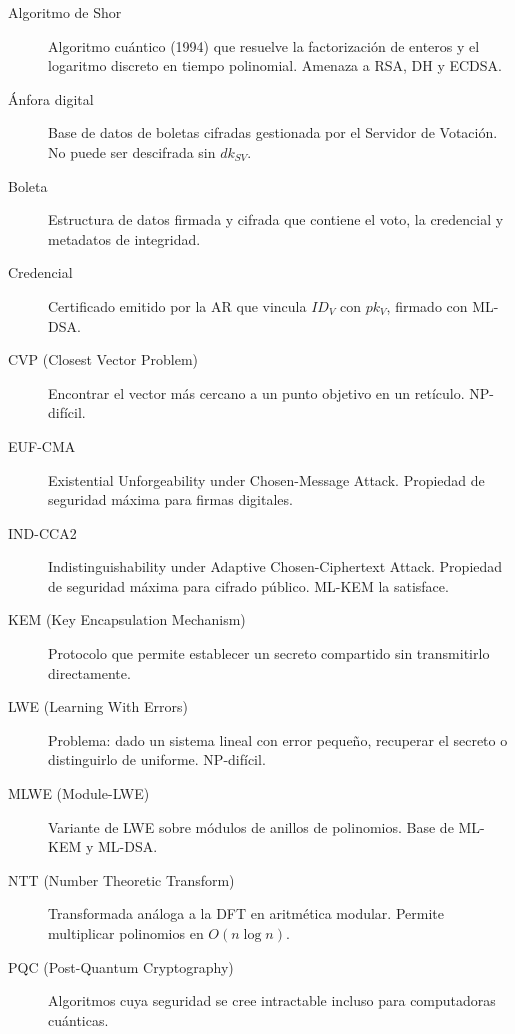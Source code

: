 \documentclass[12pt,a4paper,twoside,openright]{book}
\theoremstyle{plain}
\theoremstyle{definition}
\theoremstyle{remark}
\begin{document}
\begin{description}
  \item[Algoritmo de Shor] Algoritmo cu\'antico (1994) que resuelve la
    factorizaci\'on de enteros y el logaritmo discreto en tiempo polinomial.
    Amenaza a RSA, DH y ECDSA.

  \item[\'Anfora digital] Base de datos de boletas cifradas gestionada por
    el Servidor de Votaci\'on. No puede ser descifrada sin $dk_{SV}$.

  \item[Boleta] Estructura de datos firmada y cifrada que contiene el voto,
    la credencial y metadatos de integridad.

  \item[Credencial] Certificado emitido por la AR que vincula $ID_V$ con
    $pk_V$, firmado con ML-DSA.

  \item[CVP (Closest Vector Problem)] Encontrar el vector m\'as cercano a
    un punto objetivo en un ret\'iculo. NP-dif\'icil.

  \item[EUF-CMA] Existential Unforgeability under Chosen-Message Attack.
    Propiedad de seguridad m\'axima para firmas digitales.

  \item[IND-CCA2] Indistinguishability under Adaptive Chosen-Ciphertext Attack.
    Propiedad de seguridad m\'axima para cifrado p\'ublico. ML-KEM la satisface.

  \item[KEM (Key Encapsulation Mechanism)] Protocolo que permite establecer
    un secreto compartido sin transmitirlo directamente.

  \item[LWE (Learning With Errors)] Problema: dado un sistema lineal con error
    peque\~no, recuperar el secreto o distinguirlo de uniforme. NP-dif\'icil.

  \item[MLWE (Module-LWE)] Variante de LWE sobre m\'odulos de anillos de
    polinomios. Base de ML-KEM y ML-DSA.

  \item[NTT (Number Theoretic Transform)] Transformada an\'aloga a la DFT en
    aritm\'etica modular. Permite multiplicar polinomios en $O(n\log n)$.

  \item[PQC (Post-Quantum Cryptography)] Algoritmos cuya seguridad se
    cree intractable incluso para computadoras cu\'anticas.


\end{description}
\end{document}
